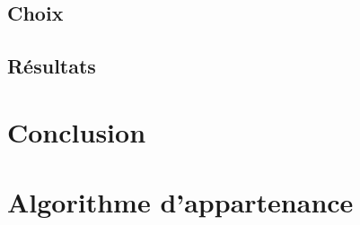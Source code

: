 	\section{Choix}\label{sec:choix}
	\section{Résultats}\label{sec:res}

	\chapter{Conclusion}\label{ch:ccl}


	\newpage
	
	

	\appendix
	\chapter{Algorithme d'appartenance}\label{app:membership}


